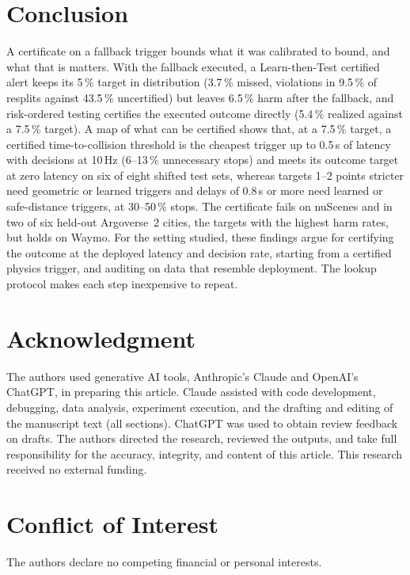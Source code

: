\documentclass[lettersize,journal]{IEEEtran}
\begin{document}
\section{Conclusion}
\label{sec:conclusion}
A certificate on a fallback trigger bounds what it was calibrated to
bound, and what that is matters. With the fallback executed, a
Learn-then-Test certified alert keeps its 5\,\% target in distribution
(3.7\,\% missed, violations in 9.5\,\% of resplits against 43.5\,\%
uncertified) but leaves 6.5\,\% harm after the fallback, and risk-ordered
testing certifies the executed outcome directly (5.4\,\% realized against a
7.5\,\% target). A map of what can be certified shows that, at a 7.5\,\% target, a certified
time-to-collision threshold is the cheapest trigger up to 0.5\,s of latency
with decisions at 10\,Hz (6--13\,\% unnecessary stops) and meets its
outcome target at zero latency on six of eight shifted test sets, whereas
targets 1--2 points stricter need geometric or learned triggers and delays of
0.8\,s or more need learned or safe-distance triggers, at 30--50\,\% stops. The
certificate fails on nuScenes and in two of six held-out Argoverse~2 cities,
the targets with the highest harm rates, but holds on Waymo. For the setting
studied, these findings argue for certifying the outcome at the deployed
latency and decision rate, starting from a certified physics trigger, and
auditing on data that resemble deployment. The lookup protocol makes each
step inexpensive to repeat.

\section*{Acknowledgment}
The authors used generative AI tools, Anthropic's Claude and OpenAI's ChatGPT, in preparing this article. Claude assisted with code development, debugging, data analysis, experiment execution, and the drafting and editing of the manuscript text (all sections). ChatGPT was used to obtain review feedback on drafts. The authors directed the research, reviewed the outputs, and take full responsibility for the accuracy, integrity, and content of this article. This research received no external funding.

\section*{Conflict of Interest}
The authors declare no competing financial or personal interests.
\end{document}
